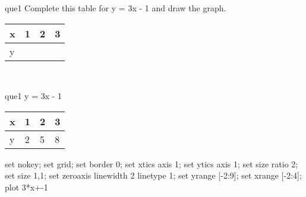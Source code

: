 \documentclass[13.5pt, varwidth=true]{beamer}
\begin{document}
\begin{frame}[shrink=19,fragile]
	\begin{beamercolorbox}[rounded=true, left, shadow=true,wd=14.8cm]{que1}
		 Complete this table for y = 3x - 1 and draw the graph. \\[0.3cm] \renewcommand{\arraystretch}{1.2}\begin{tabular}{|C|C|C|C|} \hline x & 1 & 2 & 3 \\ \hline y & & & \\ \hline \end{tabular}\\[0.3cm]
	\end{beamercolorbox}
\end{frame}
\begin{frame}[shrink=19,fragile]
	\begin{beamercolorbox}[rounded=true, left, shadow=true,wd=14.8cm]{que1}
		y = 3x - 1\renewcommand{\arraystretch}{1.2}\begin{tabular}{|C|C|C|C|} \hline x & 1 & 2 & 3 \\ \hline y & 2 & 5 & 8\\ \hline \end{tabular}\begin{gnuplot}[terminal=pdf] set nokey; set grid; set border 0; set xtics axis 1; set ytics axis 1; set size ratio 2; set size 1,1; set zeroaxis linewidth 2 linetype 1; set yrange [-2:9]; set xrange [-2:4]; plot 3*x+-1 \end{gnuplot}
	\end{beamercolorbox}
\end{frame}
\end{document}
